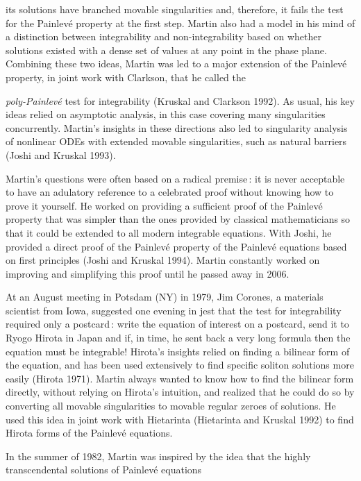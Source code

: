 \documentclass[11pt]{article}
\begin{document}
its solutions have branched movable singularities and, therefore, it fails the test for the Painlev\'e property at the first step. Martin also had a model in his mind of a distinction between integrability and non-integrability based on whether solutions existed with a dense set of values at any point in the phase plane. Combining these two ideas, Martin was led to a major extension of the Painlev\'e property, in joint work with Clarkson, that he called the {\textit{poly-Painlev\'e} test 
for integrability (Kruskal and Clarkson 1992). As usual, his key ideas relied on asymptotic analysis, in this case covering 
many singularities concurrently.  Martin's insights in these directions also led to singularity analysis of nonlinear ODEs 
with extended movable singularities, such as natural barriers (Joshi and Kruskal 1993).
\par\smallskip%
Martin's questions were often based on a radical premise\,: it is never acceptable to have an adulatory reference to a celebrated proof without knowing how to prove it yourself. He worked on providing a sufficient proof of the Painlev\'e 
property that was simpler than the ones provided by classical mathematicians so that it could be extended to all modern integrable equations. With Joshi, he provided a direct proof of the Painlev\'e property of the Painlev\'e equations based 
on first principles (Joshi and Kruskal 1994). Martin constantly worked on improving and simplifying this proof until he 
passed away in 2006. 
\par\smallskip%
At an August meeting in Potsdam (NY) in 1979, Jim Corones, a materials scientist from Iowa, suggested one evening in jest 
that the test for integrability required only a postcard\,: write the equation of interest on a postcard, send it to Ryogo Hirota in Japan and if, in time, he sent back a very long formula then the equation must be integrable! Hirota's insights 
relied on finding a bilinear form of the equation, and has been used extensively to find specific soliton solutions more 
easily (Hirota 1971). Martin always wanted to know how to find the bilinear form directly, without relying on Hirota's intuition, and realized that he could do so by converting all movable singularities to movable regular zeroes of solutions. 
He used this idea in joint work with Hietarinta (Hietarinta and Kruskal 1992) to find Hirota forms of the Painlev\'e equations. 
\par\smallskip%
In the summer of 1982, Martin was inspired by the idea that the highly transcendental solutions of Painlev\'e equations 
}
\end{document}

